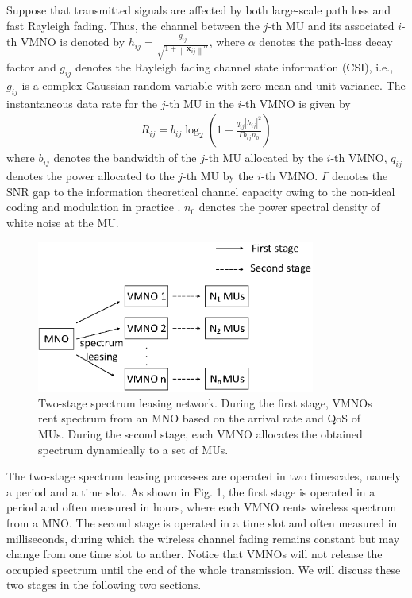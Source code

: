 \documentclass[journal]{IEEEtran}
\begin{document}
Suppose that transmitted signals are affected by both large-scale path loss and fast Rayleigh fading. Thus, the channel between the $j$-th MU and its associated $i$-th VMNO is denoted by $h_{ij} = \frac{g_{ij}}{\sqrt{1 + {\left\| \mathbf{x}_{ij} \right\|}^\alpha}}$, where $\alpha$ denotes the path-loss decay factor  and $g_{ij}$ denotes the Rayleigh fading channel state information (CSI), i.e., $g_{ij}$ is a complex Gaussian random variable with zero mean and unit variance. The instantaneous data rate for the $j$-th MU in the $i$-th VMNO is given by
\begin{align}
	R_{ij} = b_{ij}\log_2\left(1 + \frac{q_{ij} \left|h_{ij} \right|^2 }{\Gamma b_{ij}n_0}\right)
\end{align}
where $b_{ij}$ denotes the bandwidth of the $j$-th MU allocated by the $i$-th VMNO, $q_{ij}$ denotes the power allocated to the $j$-th MU by the $i$-th VMNO. $\Gamma$ denotes the SNR gap to the information theoretical channel capacity owing to the
non-ideal coding and modulation in practice \cite{JGDForney}. $n_0$ denotes the power spectral density of white noise at the MU.                      
\begin{figure}
	\centering
	\includegraphics[width=3.6in]{Pic1.eps}
	\caption{Two-stage spectrum leasing network. During the first stage, VMNOs rent spectrum from an MNO based on the arrival rate and QoS of MUs. During the second stage, each VMNO allocates the obtained spectrum dynamically to a set of MUs.}
\end{figure}

The two-stage spectrum leasing processes are operated in two timescales, namely a period and a time slot. As shown in Fig. 1, the first stage is operated in a period and often measured in hours, where each VMNO rents wireless spectrum from a MNO. The second stage is operated in a time slot and often measured in milliseconds, during which the  wireless channel fading remains constant but may change from one time slot to anther. Notice that VMNOs will not release the occupied spectrum until the end of the whole transmission. We will discuss these two stages in the following two sections.
\end{document}
